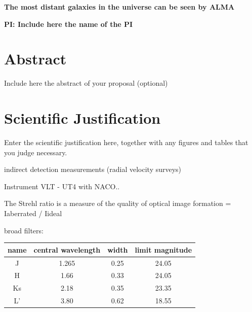 \documentclass[12pt,a4paper]{article}  %
\begin{document}
\pagestyle{plain}
 

\begin{center}
{\LARGE{\bf
{The most distant galaxies in the universe can be seen by ALMA}
}}
\end{center}
\bigskip

\centerline{\bf PI: 
{Include here the name of the PI}}

\bigskip


\section{Abstract}
Include here the abstract of your proposal (optional)



\section{Scientific Justification}

Enter the scientific justification here, together with any figures and tables that you judge necessary.

indirect detection measurements (radial velocity surveys)


Instrument VLT - UT4 with NACO..

The Strehl ratio is a measure of the quality of optical image formation = Iaberrated / Iideal


broad filters:

\begin{tabular}{ |c|c|c|c| }
\hline
name & central wavelength & width & limit magnitude\\
\hline
J & 1.265 & 0.25 & 24.05 \\
\hline
H & 1.66 & 0.33 & 24.05 \\
\hline
Ks & 2.18 & 0.35 & 23.35 \\
\hline
L' & 3.80 & 0.62 & 18.55\\
\hline
\end{tabular}
\end{document}
